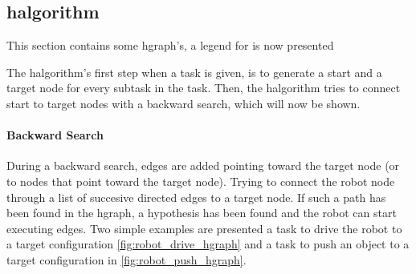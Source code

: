 \subsection{\acl{halgorithm}}%
\label{subsec:halgorithm}
This section contains some \ac{hgraph}'s, a legend for is now presented

The \ac{halgorithm}'s first step when a task is given, is to generate a start and a target node for every subtask in the task. Then, the \ac{halgorithm} tries to connect start to target nodes with a backward search, which will now be shown.\bs

\paragraph{Backward Search}%
During a backward search, edges are added pointing toward the target node (or to nodes that point toward the target node). Trying to connect the robot node through a list of succesive directed edges to a target node. If such a path has been found in the \ac{hgraph}, a hypothesis has been found and the robot can start executing edges. Two simple examples are presented a task to drive the robot to a target configuration \cref{fig:robot_drive_hgraph} and a task to push an object to a target configuration in \cref{fig:robot_push_hgraph}.\bs

